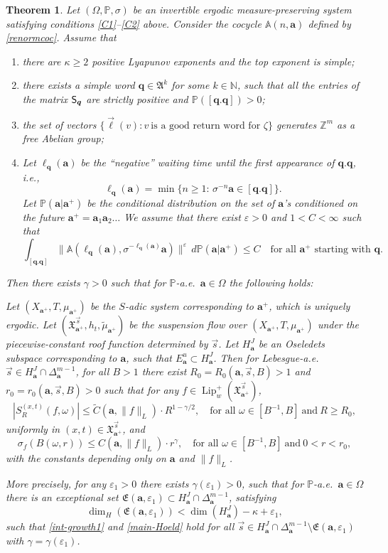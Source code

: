 \documentclass[11pt]{article}
\newcommand{\ie}{i.e.,\xspace}
\numberwithin{equation}{section}\newcommand{\Relation}[2][]{}\newtheorem*{prop*}{Proposition}
\newenvironment{enumeratea}
{\bgroup\def\theenumi{\alph{enumi}}\begin{enumerate}}
{\end{enumerate}\egroup}
\newcommand{\sep}{:}
\let\epsilon\varepsilon
\theoremstyle{plain}
\newtheorem{theorem}{Theorem}[section]
\theoremstyle{definition}
\let\wt\widetilde
\DeclareMathOperator{\Lip}{Lip}
\newcommand\bom{{\boldsymbol a}}\let\ba\bom
\newcommand \q {{\boldsymbol q}}
\newcommand\bq{{\boldsymbol q}}
\newcommand\bqcyl{[\bq.\bq]}
\let\eps\varepsilon
\let\gam\gamma
\let\om\omega
\let\Om\Omega
\let\sig\sigma
\newcommand\FrA{\mathfrak{A}}
\newcommand\Fre{\mathfrak{E}}
\newcommand\Xx{\mathfrak{X}}
\newcommand\Aa{\mathbb{A}}
\newcommand{\Z}{\mathbb{Z}}
\newcommand{\N}{\mathbb{N}}
\renewcommand{\P}{\mathbb{P}}
\newcommand\Sf{{\sf S}}
\newcommand\be{\begin{equation}}
\newcommand\ee{\end{equation}}
\begin{document}
\begin{theorem} \label{th-main1}
Let $(\Om,\P,\sig)$ be an invertible ergodic measure-preserving system satisfying conditions \eqref{C1}--\eqref{C2} above. Consider the cocycle $\Aa(n,\bom)$ defined by \eqref{renormcoc}. Assume that
\begin{enumeratea}
\item\label{th-main1a}
there are $\kappa\ge 2$ positive Lyapunov exponents
and the top exponent is simple;
\item\label{th-main1b} there exists a simple word $\bq\in \FrA^k$ for some $k\in \N$, such that all the entries of the matrix $\Sf_\bq$ are strictly positive and $\P(\bqcyl)>0$;
\item\label{th-main1c}
the set of vectors $\{\vec\ell(v)\sep v\ \text{is a good
return word for $\zeta$}\}$ generates $\Z^m$ as a free Abelian group;
\item\label{th-main1d}
Let $\ell_\bq(\bom)$ be the ``negative'' waiting time until the first appearance of $\bq.\bq$, \ie
\[
\ell_\bq(\bom) = \min\{n\ge 1:\, \sig^{-n}\bom \in \bqcyl\}.
\]
Let $\P(\bom|\bom^+)$ be the conditional distribution on the set of $\bom$'s
conditioned on the future $\bom^+ = \bom_1\bom_2\ldots$ We assume that there exist $\eps>0$ and $1<C<\infty$ such that
\be \label{eq-star1}
\int_{\bqcyl} \bigl\|\Aa(\ell_\bq(\bom), \sig^{-\ell_\bq(\bom)}\bom)\bigr\|^\eps\,d\P(\bom|\bom^+) \le C\quad \text{for all $\bom^+$ starting with $\q$}.
\ee
\end{enumeratea}
\noindent
Then there exists $\gam>0$ such that for $\P$-a.e.\ $\bom \in \Om$ the following holds:

Let $(X_{\bom^+},T,\mu_{\bom^+})$ be
the $S$-adic system corresponding to $\bom^+$, which is uniquely ergodic.
Let $(\Xx_{\bom^+}^{\vec{s}},h_t,\wt \mu_{\bom^+})$ be the suspension flow over $(X_{\bom^+},T,\mu_{\bom^+})$ under the piecewise-constant roof function determined by $\vec{s}$.
Let $H^J_\bom$ be an Oseledets subspace corresponding to $\bom$, such that $E^u_\bom\subset H^J_\bom$. Then
for Lebesgue-a.e.\ $\vec{s}\in H^J_\bom\cap \Delta_\bom^{m-1}$,
for all
$B>1$ there exist $R_0 = R_0(\bom,\vec s, B)>1$ and $r_0=r_0(\bom, \vec s, B)>0$
such that for any $f\in \Lip_w^+(\Xx_{\bom^+}^{\vec{s}})$,
\be \label{int-growth1}
|S^{(x,t)}_R(f,\om)| \le \wt{C}(\bom,\|f\|_L)\cdot R^{1-\gam/2},\quad \text{for all }\om\in[B^{-1},B]\ \text{and}\ R\ge R_0,
\ee
uniformly in $(x,t)\in \Xx_{\bom^+}^{\vec{s}}$, and
\be \label{main-Hoeld}
\sig_f(B(\om,r))\le C(\bom,\|f\|_L)\cdot r^\gam,\quad \text{for all } \om\in[B^{-1},B]\ \text{and}\ 0<r< r_0,
\ee
with the constants depending only on $\bom$ and $\|f\|_L$.

More precisely, for any $\epsilon_1>0$ there exists $\gam(\epsilon_1)>0$, such that for $\P$-a.e.\ $\bom \in \Om$ there is an exceptional set $\Fre(\bom,\epsilon_1)\subset H_\bom^J\cap \Delta_\bom^{m-1}$, satisfying
\be \label{dimesta}
\dim_H(\Fre(\bom,\epsilon_1)) < \dim(H^J_\bom)-\kappa+ \epsilon_1,
\ee
such that \eqref{int-growth1} and \eqref{main-Hoeld} hold for all $\vec s\in H^J_\bom \cap \Delta_\bom^{m-1}\setminus \Fre(\bom,\eps_1)$ with $\gam = \gam(\epsilon_1)$.
\end{theorem}
\end{document}

